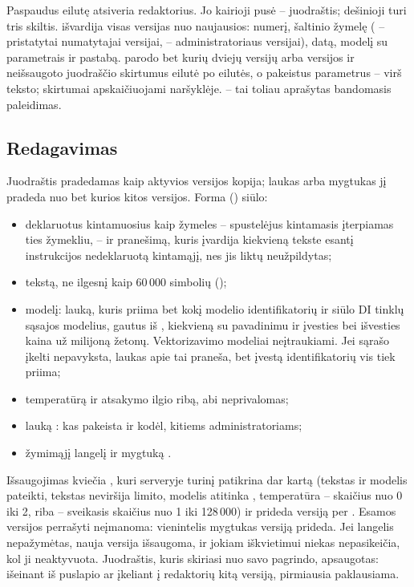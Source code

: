 Paspaudus eilutę atsiveria redaktorius. Jo kairioji pusė -- juodraštis; dešinioji turi tris
skiltis.  išvardija visas versijas nuo naujausios: numerį, šaltinio žymelę
( -- pristatytai numatytajai versijai,  -- administratoriaus
versijai), datą, modelį su parametrais ir pastabą.  parodo bet kurių dviejų
versijų arba versijos ir neišsaugoto juodraščio skirtumus eilutė po eilutės, o pakeistus
parametrus -- virš teksto; skirtumai apskaičiuojami naršyklėje.  -- tai toliau
aprašytas bandomasis paleidimas.

\subsection{Redagavimas}\label{sec:prompts:editing}

Juodraštis pradedamas kaip aktyvios versijos kopija; laukas  arba mygtukas
 jį pradeda nuo bet kurios kitos versijos. Forma
() siūlo:

\begin{itemize}
  \item deklaruotus kintamuosius kaip žymeles -- spustelėjus kintamasis įterpiamas ties
    žymekliu, -- ir pranešimą, kuris įvardija kiekvieną tekste esantį instrukcijos
    nedeklaruotą kintamąjį, nes jis liktų neužpildytas;
  \item tekstą, ne ilgesnį kaip 60\,000 simbolių ();
  \item modelį: lauką, kuris priima bet kokį modelio identifikatorių ir siūlo DI tinklų sąsajos
    modelius, gautus iš , kiekvieną su pavadinimu ir įvesties bei
    išvesties kaina už milijoną žetonų. Vektorizavimo modeliai neįtraukiami. Jei sąrašo įkelti
    nepavyksta, laukas apie tai praneša, bet įvestą identifikatorių vis tiek priima;
  \item temperatūrą ir atsakymo ilgio ribą, abi neprivalomas;
  \item lauką : kas pakeista ir kodėl, kitiems administratoriams;
  \item žymimąjį langelį  ir mygtuką .
\end{itemize}

Išsaugojimas kviečia , kuri serveryje turinį patikrina dar kartą (tekstas
ir modelis pateikti, tekstas neviršija limito, modelis atitinka , temperatūra --
skaičius nuo 0 iki 2, riba -- sveikasis skaičius nuo 1 iki 128\,000) ir prideda versiją per
. Esamos versijos perrašyti neįmanoma: vienintelis mygtukas versiją
prideda. Jei langelis nepažymėtas, nauja versija išsaugoma, ir jokiam iškvietimui niekas
nepasikeičia, kol ji neaktyvuota. Juodraštis, kuris skiriasi nuo savo pagrindo, apsaugotas:
išeinant iš puslapio ar įkeliant į redaktorių kitą versiją, pirmiausia paklausiama.

